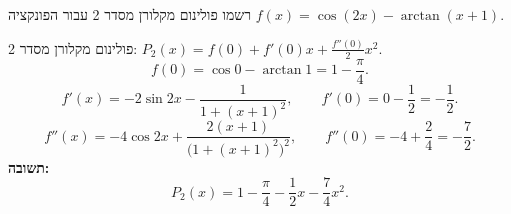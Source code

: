 
\begin{question}
רשמו פולינום מקלורן מסדר 2 עבור הפונקציה $f(x)=\cos(2x)-\arctan(x+1)$.
\end{question}

\begin{solution}
פולינום מקלורן מסדר 2: $P_2(x)=f(0)+f'(0)x+\frac{f''(0)}{2}x^2$.
\[
f(0)=\cos0-\arctan1=1-\frac\pi4.
\]
\[
f'(x)=-2\sin2x-\frac{1}{1+(x+1)^2},\qquad f'(0)=0-\frac12=-\frac12.
\]
\[
f''(x)=-4\cos2x+\frac{2(x+1)}{\big(1+(x+1)^2\big)^2},\qquad f''(0)=-4+\frac{2}{4}=-\frac72.
\]
\textbf{תשובה:}
\[
P_2(x)=1-\frac\pi4-\frac12x-\frac74x^2.
\]
\end{solution}
